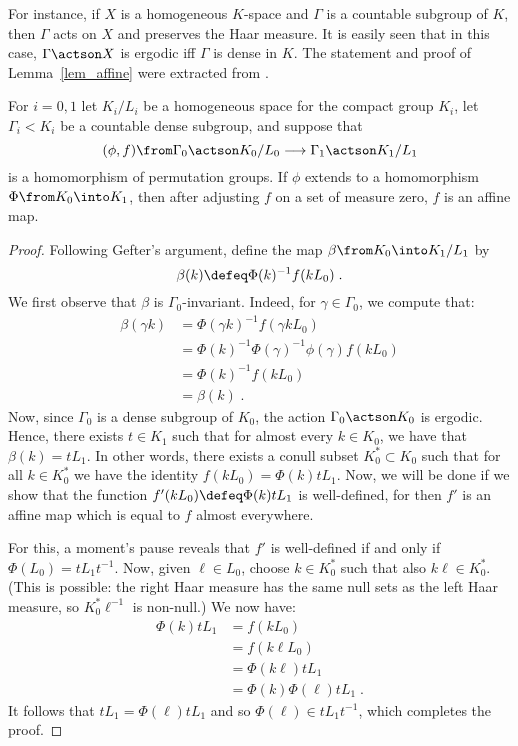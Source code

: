 \documentclass[oneside,leqno,11pt]{amsart}
\begin{document}
For instance, if $X$ is a homogeneous $K$-space and $\Gamma$ is a
countable subgroup of $K$, then $\Gamma$ acts on $X$ and preserves the
Haar measure.  It is easily seen that in this case, $\Gamma\actson X$
is ergodic iff $\Gamma$ is dense in $K$.  The statement and proof of
Lemma~\ref{lem_affine} were extracted from \cite[Theorem~3.3]{gefter}.

\begin{lem}
  \label{lem_affine}
  For $i=0,1$ let $K_i/L_i$ be a homogeneous space for the compact
  group $K_i$, let $\Gamma_i<K_i$ be a countable dense subgroup, and
  suppose that
  \[(\phi,f)\from\Gamma_0\actson K_0/L_0\longrightarrow\Gamma_1\actson K_1/L_1
  \]
  is a homomorphism of permutation groups.  If $\phi$ extends to a
  homomorphism $\Phi\from K_0\into K_1$, then after adjusting $f$ on
  a set of measure zero, $f$ is an affine map.
\end{lem}

\begin{proof}
  Following Gefter's argument, define the map $\beta\from K_0\into
  K_1/L_1$ by
  \[\beta(k)\defeq\Phi(k)^{-1}f(kL_0)\;.
  \]
  We first observe that $\beta$ is $\Gamma_0$-invariant.  Indeed, for
  $\gamma\in\Gamma_0$, we compute that:
  \begin{align*}
    \beta(\gamma k)&=\Phi(\gamma k)^{-1}f(\gamma kL_0)\\
    &=\Phi(k)^{-1}\Phi(\gamma)^{-1}\phi(\gamma)f(kL_0)\\
    &=\Phi(k)^{-1}f(kL_0)\\
    &=\beta(k)\;.
  \end{align*}
  Now, since $\Gamma_0$ is a dense subgroup of $K_0$, the action
  $\Gamma_0\actson K_0$ is ergodic.  Hence, there exists $t\in K_1$
  such that for almost every $k\in K_0$, we have that $\beta(k)=tL_1$.
  In other words, there exists a conull subset $K_0^*\subset K_0$ such
  that for all $k\in K_0^*$ we have the identity
  $f(kL_0)=\Phi(k)tL_1$.  Now, we will be done if we show that the
  function $f'(kL_0)\defeq\Phi(k)tL_1$ is well-defined, for then $f'$
  is an affine map which is equal to $f$ almost everywhere.

  For this, a moment's pause reveals that $f'$ is well-defined if and
  only if $\Phi(L_0)=tL_1t^{-1}$.  Now, given $\ell\in L_0$, choose
  $k\in K_0^*$ such that also $k\ell\in K_0^*$.  (This is possible:
  the right Haar measure has the same null sets as the left Haar
  measure, so $K_0^*\ell^{-1}$ is non-null.)  We now have:
  \begin{align*}
    \Phi(k)tL_1&=f(kL_0)\\
    &=f(k\ell L_0)\\
    &=\Phi(k\ell)tL_1\\
    &=\Phi(k)\Phi(\ell)tL_1\;.
  \end{align*}
  It follows that $tL_1=\Phi(\ell)tL_1$ and so $\Phi(\ell)\in
  tL_1t^{-1}$, which completes the proof.
\end{proof}
\end{document}
